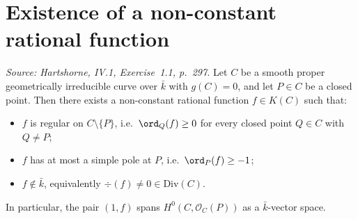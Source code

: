 \section{Existence of a non-constant rational function}

\begin{corollary}



  \label{cor:lineBundleAtClosedPoint_exists_nonconstant_genusZero}
  \label{cor:nonconstant_function_genus_zero}

  \textit{Source: Hartshorne, IV.1, Exercise~1.1, p.~297.}
  Let \(C\) be a smooth proper geometrically irreducible curve over
  \(\bar k\) with \(g(C) = 0\), and let \(P \in C\) be a closed point. Then
  there exists a non-constant rational function \(f \in K(C)\) such that:
  \begin{itemize}
    \item \(f\) is regular on \(C \setminus \{P\}\), i.e.\ \(\ord_Q(f) \geq 0\)
      for every closed point \(Q \in C\) with \(Q \neq P\);
    \item \(f\) has at most a simple pole at \(P\), i.e.\
      \(\ord_P(f) \geq -1\);
    \item \(f \notin \bar k\), equivalently
      \(\div(f) \neq 0 \in \mathrm{Div}(C)\).
  \end{itemize}
  In particular, the pair \((1, f)\) spans
  \(H^0(C, \mathcal O_C(P))\) as a \(\bar k\)-vector space.
\end{corollary}

